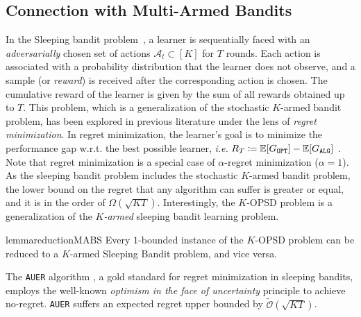 \subsection{Connection with Multi-Armed Bandits}
\label{sec:sleeping}
In the Sleeping bandit problem~\citep{kleinberg2010regret}, a learner is sequentially faced with an \emph{adversarially} chosen set of actions $\mathcal{A}_t \subset [K]$ for $T$ rounds. Each action is associated with a probability distribution that the learner does not observe, and a sample (or \textit{reward}) is received after the corresponding action is chosen. The cumulative reward of the learner is given by the sum of all rewards obtained up to $T$. This problem, which is a generalization of the stochastic $K$-armed bandit problem, has been explored in previous literature under the lens of \textit{regret minimization}. In regret minimization, the learner's goal is to minimize the performance gap w.r.t. the best possible learner, \emph{i.e.} $R_T \coloneqq \mathbb{E}[\Gopt]-\mathbb{E}[\Galg]$ \cite{lattimore2020bandit}. Note that regret minimization is a special case of $\alpha$-regret minimization ($\alpha = 1$). As the sleeping bandit problem includes the stochastic $K$-armed bandit problem, the lower bound on the regret that any algorithm can suffer is greater or equal, and it is in the order of $\Omega ( \sqrt{KT})$. Interestingly, the $K$-OPSD problem is a generalization of the \textit{$K$-armed} sleeping bandit learning problem. 
\begin{restatable}{lemma}{reductionMABS}
Every $1$-bounded instance of the $K$-OPSD problem can be reduced to a $K$-armed Sleeping Bandit problem, and vice versa.
\end{restatable}
The \texttt{AUER} algorithm \citep{kleinberg2010regret}, a gold standard for regret minimization in sleeping bandits, employs the well-known \textit{optimism in the face of uncertainty} principle \citep{auer2002finite} to achieve no-regret. \texttt{AUER} suffers an expected regret upper bounded by $\widetilde{\mathcal{O}}\left(\sqrt{KT}\right)$. 